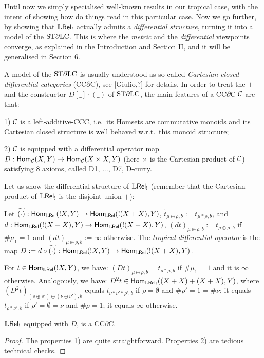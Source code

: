 Until now we simply specialised well-known results in our tropical case, with the intent of showing how do things read in this particular case.
Now we go further, by showing that $\mathbb{L} \mathsf{Rel}_!$ actually admits a \emph{differential structure}, turning it into a model of the $\mathrm{ST}\partial\mathrm{LC}$.
This is where the \emph{metric} and the \emph{differential} viewpoints converge, as explained in the Introduction and Section II, and it will be generalised in Section 6.

A model of the $\mathrm{ST}\partial\mathrm{LC}$ is usually understood as so-called \emph{Cartesian closed differential categories} (CC$\partial$C), see [Giulio,?] for details.
In order to treat the $+$ and the constructor $D[\_]\cdot (\_)$ of $\mathrm{ST}\partial\mathrm{LC}$, the main features of a CC$\partial$C $\mathcal{C}$ are that:

1) $\mathcal{C}$ is a left-additive-CCC, i.e.\ its Homsets are commutative monoids and its Cartesian closed structure is well behaved w.r.t.\ this monoid structure;

2) $\mathcal{C}$ is equipped with a differential operator map $D:\mathsf{Hom}_{\mathcal{C}}(X,Y)\to \mathsf{Hom}_{\mathcal{C}}(X\times X,Y)$ (here $\times$ is the Cartesian product of $\mathcal{C}$) satisfying $8$ axioms, called D1, ..., D7, D-curry.

Let us show the differential structure of $\mathbb{L} \mathsf{Rel}_!$ (remember that the Cartesian product of $\mathbb{L} \mathsf{Rel}_!$ is the disjoint union $+$): 

\begin{definition}
 Let $\widetilde{(\cdot)}:\mathsf{Hom}_{\mathbb{L} \mathsf{Rel}}(!X,Y)\to \mathsf{Hom}_{\mathbb{L} \mathsf{Rel}}(!(X+X),Y)$, $\widetilde t_{\mu\oplus\rho,b}:= t_{\mu*\rho,b}$, and $d:\mathsf{Hom}_{\mathbb{L} \mathsf{Rel}}(!(X+X),Y)\to \mathsf{Hom}_{\mathbb{L} \mathsf{Rel}}(!(X+X),Y)$, $(dt)_{\mu\oplus\rho,b}:=t_{\rho\oplus\mu,b}$ if $\#\mu_1=1$ and $(dt)_{\mu\oplus\rho,b}:=\infty$ otherwise.
 The \emph{tropical differential operator} is the map $D:=d\circ\widetilde{(\cdot)}:\mathsf{Hom}_{\mathbb{L} \mathsf{Rel}}(!X,Y)\to \mathsf{Hom}_{\mathbb{L} \mathsf{Rel}}(!(X+X),Y)$.
\end{definition}

\begin{example}
For $t\in\mathsf{Hom}_{\mathbb{L} \mathsf{Rel}}(!X,Y)$, we have:
 $(Dt)_{\mu\oplus\rho,b}=t_{\rho*\mu,b}$ if $\#\mu_1=1$ and it is $\infty$ otherwise.
 Analogously, we have:
 $D^2 t\in\mathsf{Hom}_{\mathbb{L} \mathsf{Rel}_!}((X+X)+(X+X),Y)$, where $(D^2 t)_{(\rho\oplus\rho')\oplus(\nu\oplus\nu'),b}$ equals $t_{\nu*\nu'*\rho',b}$ if $\rho=\emptyset$ and $\#\rho'=1=\#\nu$; it equals $t_{\rho*\nu',b}$ if $\rho'=\emptyset=\nu$ and $\#\rho=1$; it equals $\infty$ otherwise.
\end{example}

\begin{theorem}\label{thm:LREL!CCDC}
 $\mathbb{L} \mathsf{Rel}_!$ equipped with $D$, is a CC$\partial$C.
\end{theorem}
\begin{proof}
 The properties 1) are quite straightforward.
 Properties 2) are tedious technical checks.
\end{proof}

